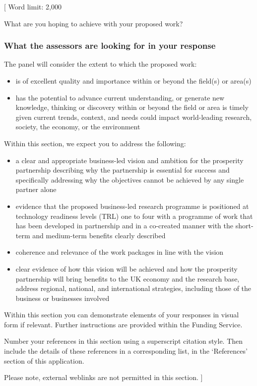\documentclass{article}
\newcommand{\desc}[1]{{\leavevmode\color{blue}[#1]}}
\begin{document}
\desc{
Word limit: 2,000

What are you hoping to achieve with your proposed work?

\subsubsection*{What the assessors are looking for in your response}

The panel will consider the extent to which the proposed work:

\begin{itemize}

    \item is of excellent quality and importance within or beyond the field(s) or area(s)
    \item has the potential to advance current understanding, or generate new knowledge,
thinking or discovery within or beyond the field or area
is timely given current trends, context, and needs
could impact world-leading research, society, the economy, or the environment
\end{itemize}

Within this section, we expect you to address the following:

\begin{itemize}

    \item a clear and appropriate business-led vision and ambition for the
        prosperity partnership describing why the partnership is essential for
        success and specifically addressing why the objectives cannot be
        achieved by any single partner alone

    \item evidence that the proposed business-led research programme is
        positioned at technology readiness levels (TRL) one to four with a
        programme of work that has been developed in partnership and in a
        co-created manner with the short-term and medium-term benefits clearly
        described

    \item coherence and relevance of the work packages in line with the vision

    \item clear evidence of how this vision will be achieved and how the
        prosperity partnership will bring benefits to the UK economy and the
        research base, address regional, national, and international
        strategies, including those of the business or businesses involved

\end{itemize}

Within this section you can demonstrate elements of your responses in visual
form if relevant. Further instructions are provided within the Funding Service.

Number your references in this section using a superscript citation style. Then
include the details of these references in a corresponding list, in the
‘References’ section of this application.

Please note, external weblinks are not permitted in this section.
}
\end{document}
